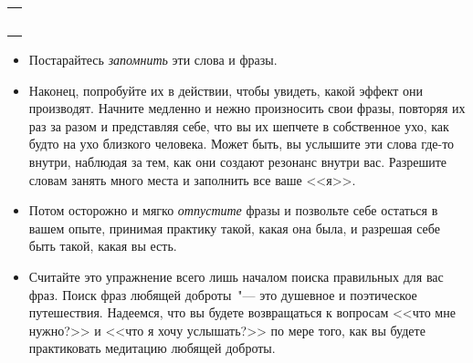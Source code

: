 \setlength{\extrarowheight}{2mm}
\begin{tabularx}{0.96\textwidth}{X}
	\\
	\arrayrulecolor{gray}\hline\\
	\hline\\
	\hline\\
	\hline\\
	\hline\\
	\hline\\
\end{tabularx}
\setlength{\extrarowheight}{0mm}

\begin{itemize}
	\item Постарайтесь \emph{запомнить} эти слова и фразы.
	
	\item Наконец, попробуйте их в действии, чтобы увидеть, какой эффект они производят. Начните медленно и нежно произносить свои фразы, повторяя их раз за разом и представляя себе, что вы их шепчете в собственное ухо, как будто на ухо близкого человека. Может быть, вы услышите эти слова где-то внутри, наблюдая за тем, как они создают резонанс внутри вас. Разрешите словам занять много места и заполнить все ваше <<я>>.
	
	\item Потом осторожно и мягко \emph{отпустите} фразы и позвольте себе остаться в вашем опыте, принимая практику такой, какая она была, и разрешая себе быть такой, какая вы есть.
	
	\item Считайте это упражнение всего лишь началом поиска правильных для вас фраз. Поиск фраз любящей доброты~"--- это душевное и поэтическое путешествия. Надеемся, что вы будете возвращаться к вопросам <<что мне нужно?>> и <<что я хочу услышать?>> по мере того, как вы будете практиковать медитацию любящей доброты.
\end{itemize}


\newpage
{} \label{M:Loving-Kindness_for_Ourselves}

